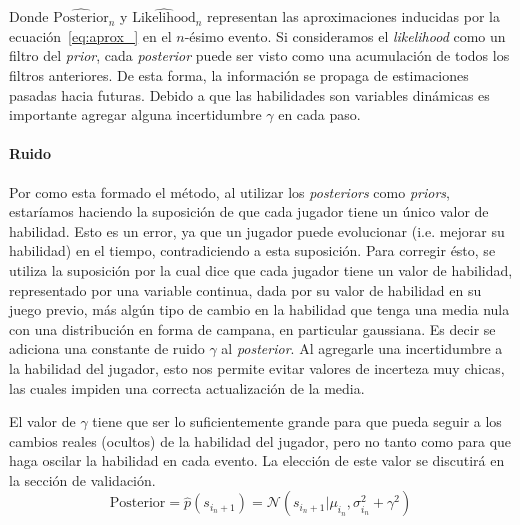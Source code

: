 \documentclass[11pt,twoside,spanish]{report} %
\begin{document}
Donde {\footnotesize $\widehat{\text{Posterior}}_n$} y {\footnotesize $\widehat{\text{Likelihood}}_n$} representan las aproximaciones inducidas por la ecuaci\'on~\ref{eq:aprox_} en el $n$-\'esimo evento.
Si consideramos el \textit{likelihood} como un filtro del \textit{prior}, cada \textit{posterior} puede ser visto como una acumulaci\'on de todos los filtros anteriores.
De esta forma, la informaci\'on se propaga de estimaciones pasadas hacia futuras.
Debido a que las habilidades son variables din\'amicas es importante agregar alguna incertidumbre $\gamma$ en cada paso.



\paragraph{Ruido}
Por como esta formado el m\'etodo, al utilizar los \textit{posteriors} como \textit{priors}, estar\'iamos haciendo la suposici\'on de que cada jugador tiene un \'unico valor de habilidad.
Esto es un error, ya que un jugador puede evolucionar (i.e. mejorar su habilidad) en el tiempo, contradiciendo a esta suposici\'on.
Para corregir \'esto, se utiliza la suposici\'on por la cual dice que cada jugador tiene un valor de habilidad, representado por una variable continua, dada por su valor de habilidad en su juego previo, m\'as alg\'un tipo de cambio en la habilidad que tenga una media nula con una distribuci\'on en forma de campana, en particular gaussiana.
Es decir se adiciona una constante de ruido $\gamma$ al \textit{posterior}.
Al agregarle una incertidumbre a la habilidad del jugador, esto nos permite evitar valores de incerteza muy chicas, las cuales impiden una correcta actualizaci\'on de la media.

El valor de  $\gamma$ tiene que ser lo suficientemente grande para que pueda seguir a los cambios reales (ocultos) de la habilidad del jugador, pero no tanto como para que haga oscilar la habilidad en cada evento.
La elecci\'on de este valor se discutir\'a en la secci\'on de validaci\'on.
\begin{equation}
	\text{Posterior}= \widehat{p}(s_{i_n+1}) = \mathcal{N}(s_{i_n+1} | \mu_{i_{n}}, \sigma_{i_{n}}^2 + \gamma^2 )
\end{equation}
\end{document}
